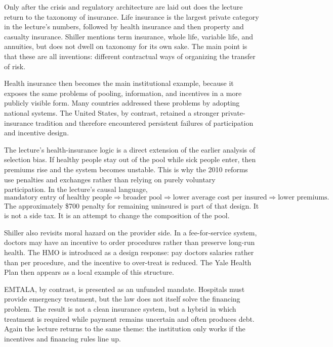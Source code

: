 Only after the crisis and regulatory architecture are laid out does the lecture return to the taxonomy of insurance. Life insurance is the largest private category in the lecture's numbers, followed by health insurance and then property and casualty insurance. Shiller mentions term insurance, whole life, variable life, and annuities, but does not dwell on taxonomy for its own sake. The main point is that these are all inventions: different contractual ways of organizing the transfer of risk.

Health insurance then becomes the main institutional example, because it exposes the same problems of pooling, information, and incentives in a more publicly visible form. Many countries addressed these problems by adopting national systems. The United States, by contrast, retained a stronger private-insurance tradition and therefore encountered persistent failures of participation and incentive design.

The lecture's health-insurance logic is a direct extension of the earlier analysis of selection bias. If healthy people stay out of the pool while sick people enter, then premiums rise and the system becomes unstable. This is why the 2010 reforms use penalties and exchanges rather than relying on purely voluntary participation. In the lecture's causal language,
\begin{equation}
\text{mandatory entry of healthy people} \Longrightarrow \text{broader pool} \Longrightarrow \text{lower average cost per insured} \Longrightarrow \text{lower premiums}.
\end{equation}
The approximately \$700 penalty for remaining uninsured is part of that design. It is not a side tax. It is an attempt to change the composition of the pool.

Shiller also revisits moral hazard on the provider side. In a fee-for-service system, doctors may have an incentive to order procedures rather than preserve long-run health. The HMO is introduced as a design response: pay doctors salaries rather than per procedure, and the incentive to over-treat is reduced. The Yale Health Plan then appears as a local example of this structure.

EMTALA, by contrast, is presented as an unfunded mandate. Hospitals must provide emergency treatment, but the law does not itself solve the financing problem. The result is not a clean insurance system, but a hybrid in which treatment is required while payment remains uncertain and often produces debt. Again the lecture returns to the same theme: the institution only works if the incentives and financing rules line up.

